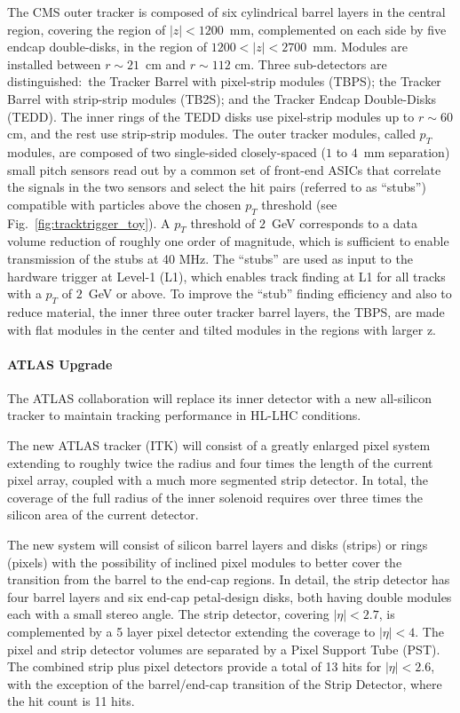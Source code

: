 The CMS outer tracker is composed of six cylindrical barrel layers in the central region, covering the region of $|z| < 1200$~mm, complemented on each side by five endcap double-disks, in
the region of $1200 < |z| < 2700$~mm. Modules are installed between $r\sim21$~cm and $r\sim112$ cm. Three sub-detectors are distinguished:~the Tracker Barrel with pixel-strip modules (TBPS); the Tracker Barrel with strip-strip modules (TB2S); and the Tracker Endcap
Double-Disks (TEDD). The inner rings of the TEDD disks use pixel-strip modules up to $r\sim 60$ cm, and the rest use strip-strip modules.
The outer tracker modules, called $p_T$ modules, are composed of two single-sided closely-spaced ($1$ to $4$~mm separation) small pitch sensors read out by a common set of front-end ASICs that correlate the signals in the two sensors and select the hit pairs (referred to as ``stubs”) compatible with particles above the chosen $p_T$ threshold (see Fig.~\ref{fig:tracktrigger_toy}). A $p_T$ threshold of $2$~GeV corresponds to a data volume reduction of roughly one order of magnitude, which is sufficient to enable transmission of the stubs at 40 MHz.
The ``stubs'' are used as input to the hardware trigger at Level-1 (L1), which enables track finding at L1 for all tracks with a $p_T$ of $2$~GeV or above. 
To improve the ``stub'' finding efficiency and also to reduce material, the inner three outer tracker barrel layers, the TBPS, are made with flat modules in the center and tilted modules in the regions with larger z. 

\paragraph{ATLAS Upgrade}
The ATLAS collaboration will replace its inner detector with a new all-silicon tracker to maintain tracking performance in
HL-LHC conditions.

The new ATLAS tracker (ITK) will consist of a greatly enlarged
pixel system extending to roughly twice the radius and four times the length of the current
pixel array, coupled with a much more segmented strip detector. In total, the coverage of the full
radius of the inner solenoid requires over three
times the silicon area of the current detector.

The new system will consist of silicon barrel layers and disks (strips) or rings
(pixels) with the possibility of inclined pixel modules to better cover the transition from
the barrel to the end-cap regions.
In detail, the strip detector has four barrel layers and six end-cap petal-design disks, both having double modules each with a small stereo angle.
The strip detector, covering $|\eta|< 2.7$,
is complemented by a 5 layer pixel detector extending the coverage to $|\eta |< 4$. The pixel
and strip detector volumes are separated by a Pixel Support Tube (PST).
The combined strip plus pixel detectors provide a total of 13 hits for $|\eta| < 2.6$, with
the exception of the barrel/end-cap transition of the Strip Detector, where the hit count is 11 hits.

